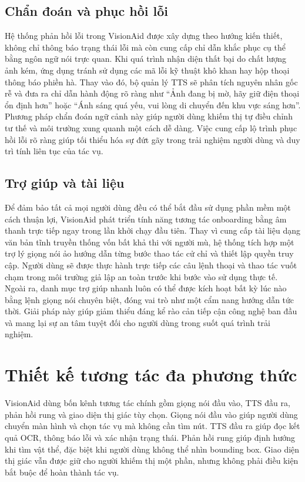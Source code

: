 \documentclass[a4paper,13pt]{report}
\begin{document}
\subsection{Chẩn đoán và phục hồi lỗi}

Hệ thống phản hồi lỗi trong VisionAid được xây dựng theo hướng kiến thiết, không chỉ thông báo trạng thái lỗi mà còn cung cấp chỉ dẫn khắc phục cụ thể bằng ngôn ngữ nói trực quan. Khi quá trình nhận diện thất bại do chất lượng ảnh kém, ứng dụng tránh sử dụng các mã lỗi kỹ thuật khô khan hay hộp thoại thông báo phiền hà. Thay vào đó, bộ quản lý TTS sẽ phân tích nguyên nhân gốc rễ và đưa ra chỉ dẫn hành động rõ ràng như ``Ảnh đang bị mờ, hãy giữ điện thoại ổn định hơn'' hoặc ``Ánh sáng quá yếu, vui lòng di chuyển đến khu vực sáng hơn''. Phương pháp chẩn đoán ngữ cảnh này giúp người dùng khiếm thị tự điều chỉnh tư thế và môi trường xung quanh một cách dễ dàng. Việc cung cấp lộ trình phục hồi lỗi rõ ràng giúp tối thiểu hóa sự đứt gãy trong trải nghiệm người dùng và duy trì tính liên tục của tác vụ.

\subsection{Trợ giúp và tài liệu}

Để đảm bảo tất cả mọi người dùng đều có thể bắt đầu sử dụng phần mềm một cách thuận lợi, VisionAid phát triển tính năng tương tác onboarding bằng âm thanh trực tiếp ngay trong lần khởi chạy đầu tiên. Thay vì cung cấp tài liệu dạng văn bản tĩnh truyền thống vốn bất khả thi với người mù, hệ thống tích hợp một trợ lý giọng nói ảo hướng dẫn từng bước thao tác cử chỉ và thiết lập quyền truy cập. Người dùng sẽ được thực hành trực tiếp các câu lệnh thoại và thao tác vuốt chạm trong môi trường giả lập an toàn trước khi bước vào sử dụng thực tế. Ngoài ra, danh mục trợ giúp nhanh luôn có thể được kích hoạt bất kỳ lúc nào bằng lệnh giọng nói chuyên biệt, đóng vai trò như một cẩm nang hướng dẫn tức thời. Giải pháp này giúp giảm thiểu đáng kể rào cản tiếp cận công nghệ ban đầu và mang lại sự an tâm tuyệt đối cho người dùng trong suốt quá trình trải nghiệm.

\section{Thiết kế tương tác đa phương thức}

VisionAid dùng bốn kênh tương tác chính gồm giọng nói đầu vào, TTS đầu ra, phản hồi rung và giao diện thị giác tùy chọn. Giọng nói đầu vào giúp người dùng chuyển màn hình và chọn tác vụ mà không cần tìm nút. TTS đầu ra giúp đọc kết quả OCR, thông báo lỗi và xác nhận trạng thái. Phản hồi rung giúp định hướng khi tìm vật thể, đặc biệt khi người dùng không thể nhìn bounding box. Giao diện thị giác vẫn được giữ cho người khiếm thị một phần, nhưng không phải điều kiện bắt buộc để hoàn thành tác vụ.
\end{document}

